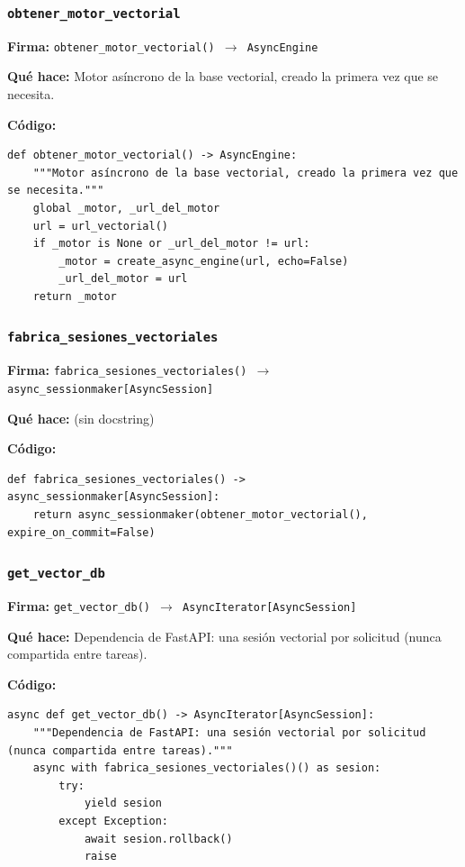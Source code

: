 \documentclass[11pt,a4paper]{article}
\begin{document}
\subsubsection*{\texttt{obtener\_motor\_vectorial}}
\textbf{Firma:} \texttt{obtener\_motor\_vectorial() $\rightarrow$ AsyncEngine}

\textbf{Qué hace:} Motor asíncrono de la base vectorial, creado la primera vez que se necesita.

\textbf{Código:}
\begin{lstlisting}
def obtener_motor_vectorial() -> AsyncEngine:
    """Motor asíncrono de la base vectorial, creado la primera vez que se necesita."""
    global _motor, _url_del_motor
    url = url_vectorial()
    if _motor is None or _url_del_motor != url:
        _motor = create_async_engine(url, echo=False)
        _url_del_motor = url
    return _motor
\end{lstlisting}

\subsubsection*{\texttt{fabrica\_sesiones\_vectoriales}}
\textbf{Firma:} \texttt{fabrica\_sesiones\_vectoriales() $\rightarrow$ async\_sessionmaker[AsyncSession]}

\textbf{Qué hace:} (sin docstring)

\textbf{Código:}
\begin{lstlisting}
def fabrica_sesiones_vectoriales() -> async_sessionmaker[AsyncSession]:
    return async_sessionmaker(obtener_motor_vectorial(), expire_on_commit=False)
\end{lstlisting}

\subsubsection*{\texttt{get\_vector\_db}}
\textbf{Firma:} \texttt{get\_vector\_db() $\rightarrow$ AsyncIterator[AsyncSession]}

\textbf{Qué hace:} Dependencia de FastAPI: una sesión vectorial por solicitud (nunca compartida entre tareas).

\textbf{Código:}
\begin{lstlisting}
async def get_vector_db() -> AsyncIterator[AsyncSession]:
    """Dependencia de FastAPI: una sesión vectorial por solicitud (nunca compartida entre tareas)."""
    async with fabrica_sesiones_vectoriales()() as sesion:
        try:
            yield sesion
        except Exception:
            await sesion.rollback()
            raise
\end{lstlisting}
\end{document}
